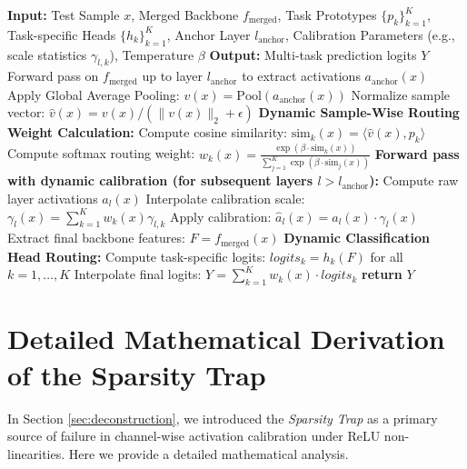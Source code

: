 \documentclass{article}
\theoremstyle{plain}
\theoremstyle{definition}
\theoremstyle{remark}
\begin{document}
\begin{algorithm}[h]
\caption{SRAC Test-Time Inference and Calibration}
\label{alg:srac_inference}
\begin{algorithmic}[1]
\STATE \textbf{Input:} Test Sample $x$, Merged Backbone $f_{\text{merged}}$, Task Prototypes $\{p_k\}_{k=1}^K$, Task-specific Heads $\{h_k\}_{k=1}^K$, Anchor Layer $l_{\text{anchor}}$, Calibration Parameters (e.g., scale statistics $\gamma_{l,k}$), Temperature $\beta$
\STATE \textbf{Output:} Multi-task prediction logits $Y$
\STATE Forward pass on $f_{\text{merged}}$ up to layer $l_{\text{anchor}}$ to extract activations $a_{\text{anchor}}(x)$
\STATE Apply Global Average Pooling: $v(x) = \text{Pool}(a_{\text{anchor}}(x))$
\STATE Normalize sample vector: $\hat{v}(x) = v(x) / (\|v(x)\|_2 + \epsilon)$
\STATE \textbf{Dynamic Sample-Wise Routing Weight Calculation:}
    \STATE Compute cosine similarity: $\text{sim}_k(x) = \langle \hat{v}(x), p_k \rangle$
\ENDFOR
{}
    \STATE Compute softmax routing weight: $w_k(x) = \frac{\exp(\beta \cdot \text{sim}_k(x))}{\sum_{j=1}^K \exp(\beta \cdot \text{sim}_j(x))}$
\ENDFOR
\STATE \textbf{Forward pass with dynamic calibration (for subsequent layers $l > l_{\text{anchor}}$):}
    \STATE Compute raw layer activations $a_l(x)$
    \STATE Interpolate calibration scale: $\gamma_l(x) = \sum_{k=1}^K w_k(x) \gamma_{l,k}$
    \STATE Apply calibration: $\hat{a}_l(x) = a_l(x) \cdot \gamma_l(x)$
\ENDFOR
\STATE Extract final backbone features: $F = f_{\text{merged}}(x)$
\STATE \textbf{Dynamic Classification Head Routing:}
\STATE Compute task-specific logits: $logits_k = h_k(F)$ for all $k = 1, \dots, K$
\STATE Interpolate final logits: $Y = \sum_{k=1}^K w_k(x) \cdot logits_k$
\STATE \textbf{return} $Y$
\end{algorithmic}
\end{algorithm}

\section{Detailed Mathematical Derivation of the Sparsity Trap}
\label{sec:appendix_sparsity}

In Section \ref{sec:deconstruction}, we introduced the \emph{Sparsity Trap} as a primary source of failure in channel-wise activation calibration under ReLU non-linearities. Here we provide a detailed mathematical analysis.
\end{document}
